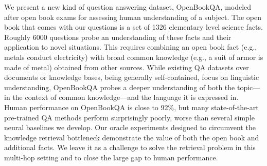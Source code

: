 We present a new kind of question answering dataset, OpenBookQA, modeled after open book exams for assessing human understanding of a subject. The open book that comes with our questions is a set of 1326 elementary level science facts. Roughly 6000 questions probe an understanding of these facts and their application to novel situations. This requires combining an open book fact (e.g., metals conduct electricity) with broad common knowledge (e.g., a suit of armor is made of metal) obtained from other sources. While existing QA datasets over documents or knowledge bases, being generally self-contained, focus on linguistic understanding, OpenBookQA probes a deeper understanding of both the topic---in the context of common knowledge---and the language it is expressed in. Human performance on OpenBookQA is close to 92\%, but many state-of-the-art pre-trained QA methods perform surprisingly poorly, worse than several simple neural baselines we develop. Our oracle experiments designed to circumvent the knowledge retrieval bottleneck demonstrate the value of both the open book and additional facts. We leave it as a challenge to solve the retrieval problem in this multi-hop setting and to close the large gap to human performance.
